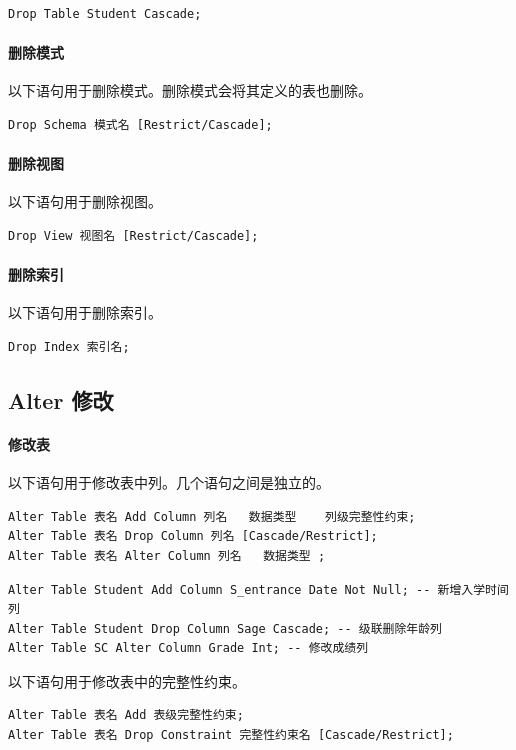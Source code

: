 \documentclass[UTF8]{ctexart}
\begin{document}
\begin{lstlisting}[backgroundcolor=\color{white}]
Drop Table Student Cascade;
\end{lstlisting}

\paragraph{删除模式} 以下语句用于删除模式。删除模式会将其定义的表也删除。
\begin{lstlisting}
Drop Schema 模式名 [Restrict/Cascade];
\end{lstlisting}

\paragraph{删除视图}以下语句用于删除视图。
\begin{lstlisting}
Drop View 视图名 [Restrict/Cascade];
\end{lstlisting}

\paragraph{删除索引}以下语句用于删除索引。
\begin{lstlisting}
Drop Index 索引名;
\end{lstlisting}

\subsection{Alter 修改}
\paragraph{修改表} 以下语句用于修改表中列。几个语句之间是独立的。
\begin{lstlisting}
Alter Table 表名 Add Column 列名   数据类型    列级完整性约束;
Alter Table 表名 Drop Column 列名 [Cascade/Restrict];
Alter Table 表名 Alter Column 列名   数据类型 ;
\end{lstlisting}

\begin{lstlisting}[backgroundcolor=\color{white}]
Alter Table Student Add Column S_entrance Date Not Null; -- 新增入学时间列
Alter Table Student Drop Column Sage Cascade; -- 级联删除年龄列
Alter Table SC Alter Column Grade Int; -- 修改成绩列
\end{lstlisting}

以下语句用于修改表中的完整性约束。
\begin{lstlisting}
Alter Table 表名 Add 表级完整性约束;
Alter Table 表名 Drop Constraint 完整性约束名 [Cascade/Restrict];
\end{lstlisting}
\end{document}
